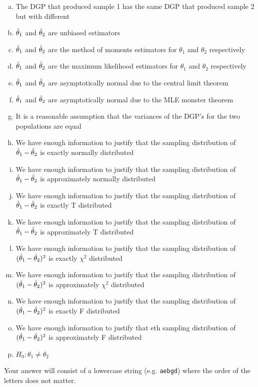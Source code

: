 \documentclass[12pt,landscape]{article}
\newcommand{\instr}{\small Your answer will consist of a lowercase string (e.g. \texttt{aebgd}) where the order of the letters does not matter. \normalsize}
\begin{document}
\begin{enumerate}[(a)]
\item The DGP that produced sample 1 has the same DGP that produced sample 2 but with different
\item $\hat{\theta}_1$ and $\hat{\theta}_2$ are unbiased estimators
\item $\hat{\theta}_1$ and $\hat{\theta}_2$ are the method of moments estimators for $\theta_1$ and $\theta_2$ respectively
\item $\hat{\theta}_1$ and $\hat{\theta}_2$ are the maximum likelihood estimators for $\theta_1$ and $\theta_2$ respectively
\item $\hat{\theta}_1$ and $\hat{\theta}_2$ are asymptotically normal due to the central limit theorem
\item $\hat{\theta}_1$ and $\hat{\theta}_2$ are asymptotically normal due to the MLE monster theorem
\item It is a reasonable assumption that the variances of the DGP's for the two populations are equal

\item We have enough information to justify that the sampling distribution of $\hat{\theta}_1 - \hat{\theta}_2$ is exactly normally distributed
\item We have enough information to justify that the sampling distribution of $\hat{\theta}_1 - \hat{\theta}_2$ is approximately normally distributed
\item We have enough information to justify that the sampling distribution of $\hat{\theta}_1 - \hat{\theta}_2$ is exactly T distributed
\item We have enough information to justify that the sampling distribution of $\hat{\theta}_1 - \hat{\theta}_2$ is approximately T distributed
\item We have enough information to justify that the sampling distribution of $(\hat{\theta}_1 - \hat{\theta}_2)^2$ is exactly $\chi^2$ distributed
\item We have enough information to justify that the sampling distribution of $(\hat{\theta}_1 - \hat{\theta}_2)^2$ is approximately $\chi^2$ distributed
\item We have enough information to justify that the sampling distribution of $(\hat{\theta}_1 - \hat{\theta}_2)^2$ is exactly F distributed
\item We have enough information to justify that eth sampling distribution of $(\hat{\theta}_1 - \hat{\theta}_2)^2$ is approximately F distributed

\item $H_0: \theta_1 \neq \theta_2$
\end{enumerate}
\eenum\instr\pagebreak
\end{document}
